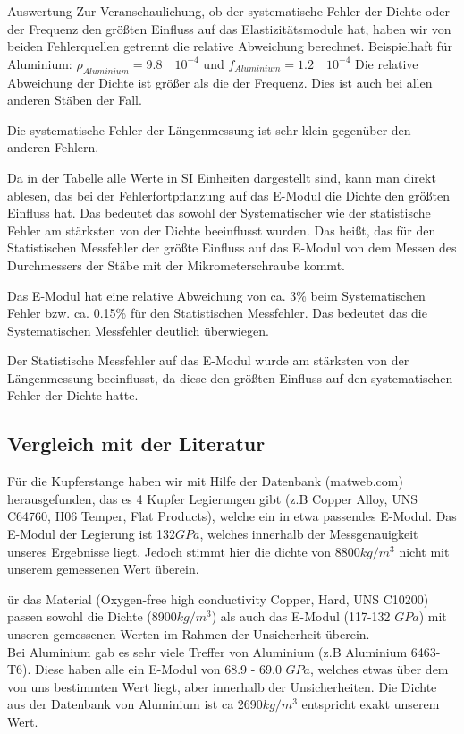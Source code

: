 \documentclass[twoside]{protokoll}
\begin{document}
\begin{aufgabe}{Auswertung}
Zur Veranschaulichung, ob der systematische Fehler der Dichte oder der Frequenz den größten Einfluss auf das Elastizitätsmodule hat, haben wir von beiden Fehlerquellen getrennt die relative Abweichung berechnet.
Beispielhaft für Aluminium:
$ \rho_{Aluminium} = 9.8 \quad 10^{-4} $ und $ f_{Aluminium} = 1.2 \quad 10^{-4} $
Die relative Abweichung der Dichte ist größer als die der Frequenz. Dies ist auch bei allen anderen Stäben der Fall.

Die systematische Fehler der Längenmessung ist sehr klein gegenüber den anderen Fehlern.

Da in der Tabelle alle Werte in SI Einheiten dargestellt sind, kann man direkt ablesen,
das bei der Fehlerfortpflanzung auf das E-Modul die Dichte den größten Einfluss hat. 
Das bedeutet das sowohl der Systematischer wie der statistische Fehler am stärksten von der Dichte beeinflusst wurden.
Das heißt, das für den Statistischen Messfehler der größte Einfluss auf das E-Modul von dem Messen des Durchmessers der Stäbe mit der Mikrometerschraube kommt.
 
Das E-Modul hat eine relative Abweichung von ca. 3\% beim Systematischen Fehler bzw. ca. 0.15\% für den Statistischen Messfehler.
Das bedeutet das die Systematischen Messfehler deutlich überwiegen.
 
Der Statistische Messfehler auf das E-Modul wurde am stärksten von der Längenmessung beeinflusst, da diese den größten Einfluss auf den systematischen Fehler der Dichte hatte. \\
\subsection{Vergleich mit der Literatur} 

Für die Kupferstange haben wir mit Hilfe der Datenbank (matweb.com) herausgefunden, das es 4 Kupfer Legierungen gibt (z.B Copper Alloy, UNS C64760, H06 Temper, Flat Products), welche ein in etwa passendes E-Modul.
Das E-Modul der Legierung ist 132$GPa$, welches innerhalb der Messgenauigkeit unseres Ergebnisse liegt.
Jedoch stimmt hier die dichte von 8800$kg/m^3$ nicht mit unserem gemessenen Wert überein.
 
ür das Material (Oxygen-free high conductivity Copper, Hard, UNS C10200) passen sowohl die Dichte (8900$kg/m^3$) als auch das E-Modul (117-132 $GPa$) mit unseren gemessenen Werten im Rahmen der Unsicherheit überein. \\
 
Bei Aluminium gab es sehr viele Treffer von Aluminium (z.B Aluminium 6463-T6).
Diese haben alle ein E-Modul von 68.9 - 69.0 $GPa$, welches etwas über dem von uns bestimmten Wert liegt, aber innerhalb der Unsicherheiten.
Die Dichte aus der Datenbank von Aluminium ist ca 2690$kg/m^3$ entspricht exakt unserem Wert. \\
 

\end{aufgabe}
\end{document}
